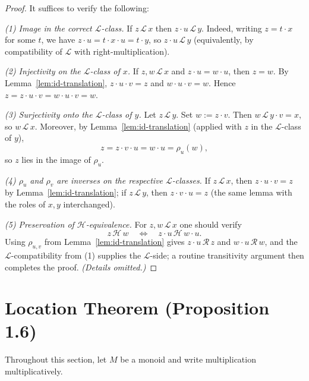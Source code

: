 \begin{proof}
It suffices to verify the following:

\medskip
\noindent\emph{(1) Image in the correct \(\mathcal L\)-class.}
If \(z \,\mathcal L\, x\) then \(z\cdot u \,\mathcal L\, y\).
Indeed, writing \(z = t\cdot x\) for some \(t\), we have
\(z\cdot u = t\cdot x\cdot u = t\cdot y\), so \(z\cdot u \,\mathcal L\, y\)
(equivalently, by compatibility of \(\mathcal L\) with right-multiplication).

\medskip
\noindent\emph{(2) Injectivity on the \(\mathcal L\)-class of \(x\).}
If \(z,w \,\mathcal L\, x\) and \(z\cdot u = w\cdot u\), then \(z=w\).
By Lemma~\ref{lem:id-translation}, \(z\cdot u\cdot v = z\) and \(w\cdot u\cdot v = w\).
Hence \(z = z\cdot u\cdot v = w\cdot u\cdot v = w\).

\medskip
\noindent\emph{(3) Surjectivity onto the \(\mathcal L\)-class of \(y\).}
Let \(z \,\mathcal L\, y\). Set \(w := z\cdot v\).
Then \(w \,\mathcal L\, y\cdot v = x\), so \(w \,\mathcal L\, x\).
Moreover, by Lemma~\ref{lem:id-translation} (applied with \(z\) in the \(\mathcal L\)-class of \(y\)),
\[
z = z\cdot v\cdot u = w\cdot u = \rho_u(w),
\]
so \(z\) lies in the image of \(\rho_u\).

\medskip
\noindent\emph{(4) \(\rho_u\) and \(\rho_v\) are inverses on the respective \(\mathcal L\)-classes.}
If \(z \,\mathcal L\, x\), then \(z\cdot u\cdot v = z\) by Lemma~\ref{lem:id-translation};
if \(z \,\mathcal L\, y\), then \(z\cdot v\cdot u = z\) (the same lemma with the roles of \(x,y\) interchanged).

\medskip
\noindent\emph{(5) Preservation of \(\mathcal H\)-equivalence.}
For \(z,w \,\mathcal L\, x\) one should verify
\[
z \,\mathcal H\, w \quad\Longleftrightarrow\quad z\cdot u \,\mathcal H\, w\cdot u.
\]
Using \(\rho_{u,v}\) from Lemma~\ref{lem:id-translation} gives \(z\cdot u \,\mathcal R\, z\) and \(w\cdot u \,\mathcal R\, w\),
and the \(\mathcal L\)-compatibility from (1) supplies the \(\mathcal L\)-side; a routine transitivity argument then completes the proof. \emph{(Details omitted.)}
\end{proof}


\section{Location Theorem (Proposition 1.6)}

Throughout this section, let \(M\) be a monoid and write multiplication multiplicatively.

